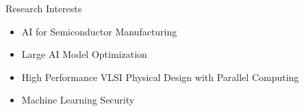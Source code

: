 
\begin{rSection}{Research Interests}
\begin{itemize}
 \item AI for Semiconductor Manufacturing
 \item Large AI Model Optimization
 \item High Performance VLSI Physical Design with Parallel Computing
 \item Machine Learning Security
\end{itemize}
\end{rSection}



